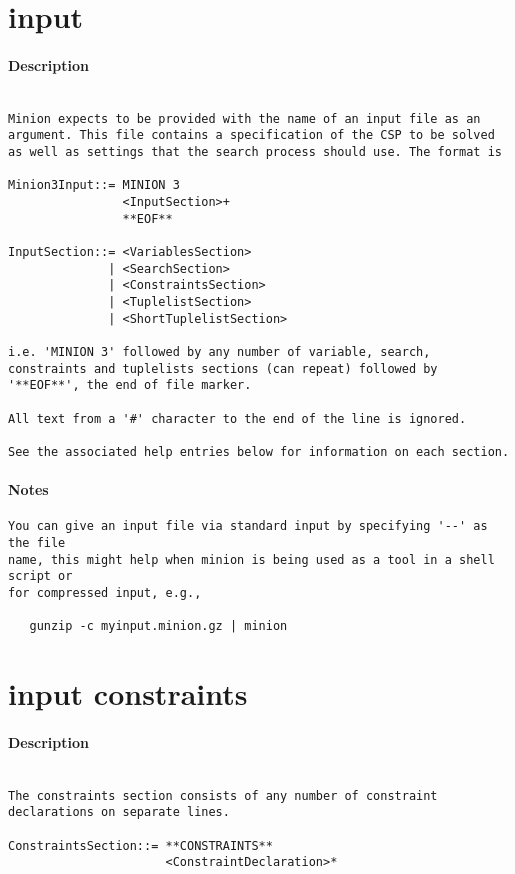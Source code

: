 \section{input}
\paragraph{Description}
{\footnotesize
\begin{verbatim}

Minion expects to be provided with the name of an input file as an
argument. This file contains a specification of the CSP to be solved
as well as settings that the search process should use. The format is

Minion3Input::= MINION 3
                <InputSection>+
                **EOF**

InputSection::= <VariablesSection> 
              | <SearchSection>
              | <ConstraintsSection> 
              | <TuplelistSection>
              | <ShortTuplelistSection>

i.e. 'MINION 3' followed by any number of variable, search,
constraints and tuplelists sections (can repeat) followed by
'**EOF**', the end of file marker.

All text from a '#' character to the end of the line is ignored.

See the associated help entries below for information on each section.
\end{verbatim}
}
\paragraph{Notes}
{\footnotesize
\begin{verbatim}
You can give an input file via standard input by specifying '--' as the file
name, this might help when minion is being used as a tool in a shell script or
for compressed input, e.g.,

   gunzip -c myinput.minion.gz | minion
\end{verbatim}
}
\section{input constraints}
\paragraph{Description}
{\footnotesize
\begin{verbatim}

The constraints section consists of any number of constraint
declarations on separate lines.

ConstraintsSection::= **CONSTRAINTS**
                      <ConstraintDeclaration>*
\end{verbatim}
}
